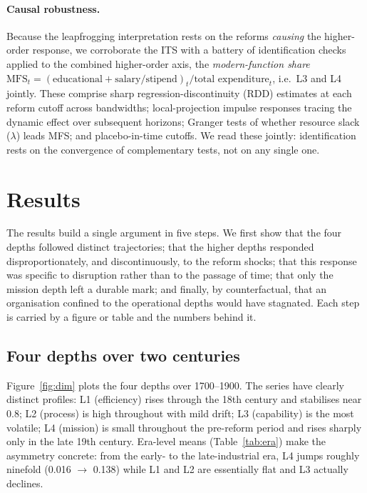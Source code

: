 \documentclass[11pt]{article}
\begin{document}
\paragraph{Causal robustness.} Because the leapfrogging interpretation rests on the reforms
\emph{causing} the higher-order response, we corroborate the ITS with a battery of identification
checks applied to the combined higher-order axis, the \emph{modern-function share}
$\text{MFS}_t = (\text{educational} + \text{salary/stipend})_t / \text{total expenditure}_t$,
i.e.\ L3 and L4 jointly. These comprise sharp regression-discontinuity (RDD) estimates at each
reform cutoff across bandwidths; local-projection impulse responses tracing the dynamic effect
over subsequent horizons; Granger tests of whether resource slack ($\lambda$) leads MFS; and
placebo-in-time cutoffs. We read these jointly: identification rests on the convergence of
complementary tests, not on any single one.

\section{Results}
\label{sec:results}

The results build a single argument in five steps. We first show that the four depths followed
distinct trajectories; that the higher depths responded disproportionately, and discontinuously,
to the reform shocks; that this response was specific to disruption rather than to the passage of
time; that only the mission depth left a durable mark; and finally, by counterfactual, that an
organisation confined to the operational depths would have stagnated. Each step is carried by a
figure or table and the numbers behind it.

\subsection{Four depths over two centuries}

Figure~\ref{fig:dim} plots the four depths over 1700--1900. The series have clearly distinct
profiles: L1 (efficiency) rises through the 18th century and stabilises near 0.8; L2 (process)
is high throughout with mild drift; L3 (capability) is the most volatile; L4 (mission) is small
throughout the pre-reform period and rises sharply only in the late 19th century. Era-level
means (Table~\ref{tab:era}) make the asymmetry concrete: from the early- to the late-industrial
era, L4 jumps roughly ninefold (0.016 $\to$ 0.138) while L1 and L2 are essentially flat and L3
actually declines.
\end{document}
